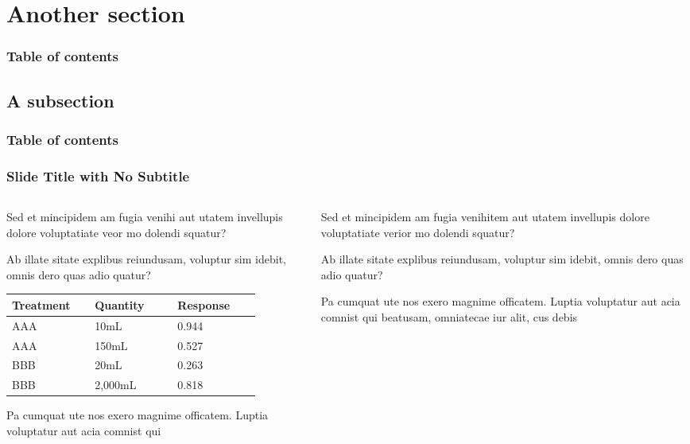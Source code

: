 \documentclass[
	aspectratio=169, %
	t, %
	onlytextwidth, %
	10pt, %
]{beamer}
\begin{document}

\section{Another section}
\begin{frame}
    \frametitle{Table of contents}
    \tableofcontents[currentsection]
\end{frame}

\subsection{A subsection}
\begin{frame}
    \frametitle{Table of contents}
    \tableofcontents[currentsubsection]
\end{frame}

\begin{frame}
	\frametitle{Slide Title with No Subtitle}
	
	\begin{columns}[T] %
		\begin{column}{0.48\linewidth} %
			Sed et mincipidem am fugia venihi aut utatem invellupis dolore voluptatiate veor mo dolendi squatur?

			Ab illate sitate explibus reiundusam, voluptur sim idebit, omnis dero quas adio quatur?
			
			\begin{tabular}{L{0.28\linewidth} C{0.28\linewidth} R{0.28\linewidth}}
				\toprule
				Treatment & Quantity & Response\\
				\midrule
				AAA & 10mL & 0.944\\
				AAA & 150mL & 0.527\\
				BBB & 20mL & 0.263\\
				BBB & 2,000mL & 0.818\\
				\bottomrule
			\end{tabular}
			
			Pa cumquat ute nos exero magnime officatem. Luptia voluptatur aut acia comnist qui
		\end{column}
		\begin{column}{0.48\linewidth} %
			Sed et mincipidem am fugia venihitem aut utatem invellupis dolore voluptatiate verior mo dolendi squatur?

			Ab illate sitate explibus reiundusam, voluptur sim idebit, omnis dero quas adio quatur?

			Pa cumquat ute nos exero magnime officatem. Luptia voluptatur aut acia comnist qui beatusam, omniatecae iur alit, cus debis
		\end{column}
	\end{columns}
\end{frame}
\end{document}

